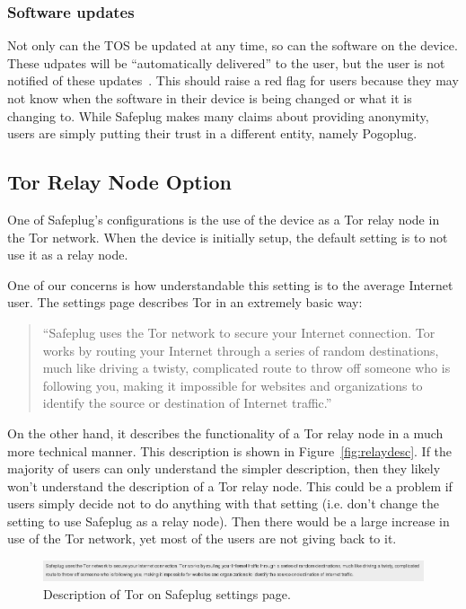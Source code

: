 \subsubsection{Software updates} Not only can the TOS be updated at any time, so can the software on the device.  These udpates will be ``automatically delivered'' to the user, but the user is not notified of these updates~\cite{safeplug}.  This should raise a red flag for users because they may not know when the software in their device is being changed or what it is changing to.  While Safeplug makes many claims about providing anonymity, users are simply putting their trust in a different entity, namely Pogoplug.

\subsection{Tor Relay Node Option}
One of Safeplug's configurations is the use of the device as a Tor relay node in the Tor network.  When the device is initially setup, the default setting is to not use it as a relay node.  

One of our concerns is how understandable this setting is to the average Internet user.  The settings page describes Tor in an extremely basic way:

\begin{quotation}
``Safeplug uses the Tor network to secure your Internet connection.  Tor works by routing your Internet through a series of random destinations, much like driving a twisty, complicated route to throw off someone who is following you, making it impossible for websites and organizations to identify the source or destination of Internet traffic.'' \cite{safeplug}
\end{quotation}

On the other hand, it describes the functionality of a Tor relay node in a much more technical manner.  This description is shown in Figure~\ref{fig:relaydesc}.  If the majority of users can only understand the simpler description, then they likely won't understand the description of a Tor relay node.  This could be a problem if users simply decide not to do anything with that setting (i.e. don't change the setting to use Safeplug as a relay node).  Then there would be a large increase in use of the Tor network, yet most of the users are not giving back to it.

\begin{figure}[th]
\begin{center}
\includegraphics[width=\textwidth]{funnydesc.png}
\caption{Description of Tor on Safeplug settings page.}
\label{fig:funnydesc}
\end{center}
\end{figure}

